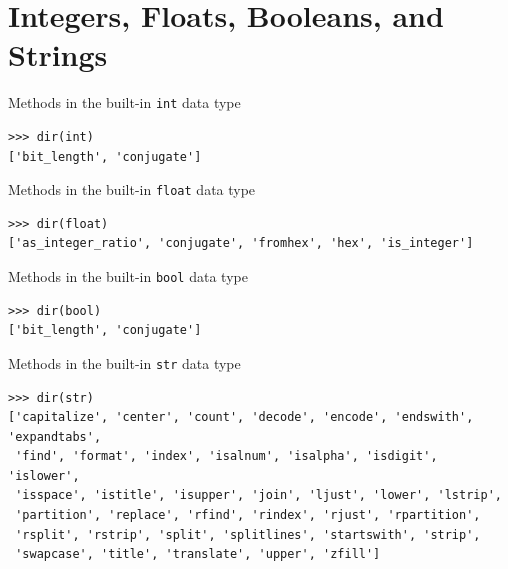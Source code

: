 \documentclass[8pt,a4paper,compress]{beamer}
\begin{document}
\section{Integers, Floats, Booleans, and Strings}
\begin{frame}[fragile]
\pause

Methods in the built-in \lstinline{int} data type

\smallskip

\begin{lstlisting}[language={},style=focusin]
>>> dir(int) 
['bit_length', 'conjugate']
\end{lstlisting}

\pause
\bigskip

Methods in the built-in \lstinline{float} data type

\smallskip

\begin{lstlisting}[language={},style=focusin]
>>> dir(float) 
['as_integer_ratio', 'conjugate', 'fromhex', 'hex', 'is_integer']
\end{lstlisting}

\pause
\bigskip

Methods in the built-in \lstinline{bool} data type

\smallskip

\begin{lstlisting}[language={},style=focusin]
>>> dir(bool) 
['bit_length', 'conjugate']
\end{lstlisting}

\pause
\bigskip

Methods in the built-in \lstinline{str} data type

\smallskip

\begin{lstlisting}[language={},style=focusin]
>>> dir(str)
['capitalize', 'center', 'count', 'decode', 'encode', 'endswith', 'expandtabs', 
 'find', 'format', 'index', 'isalnum', 'isalpha', 'isdigit', 'islower', 
 'isspace', 'istitle', 'isupper', 'join', 'ljust', 'lower', 'lstrip', 
 'partition', 'replace', 'rfind', 'rindex', 'rjust', 'rpartition', 
 'rsplit', 'rstrip', 'split', 'splitlines', 'startswith', 'strip', 
 'swapcase', 'title', 'translate', 'upper', 'zfill']
\end{lstlisting}
\end{frame}
\end{document}
